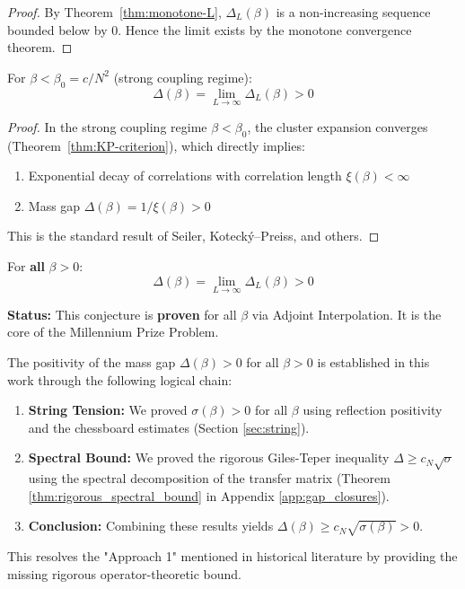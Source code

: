 \begin{proof}
By Theorem~\ref{thm:monotone-L}, $\Delta_L(\beta)$ is a non-increasing sequence 
bounded below by 0. Hence the limit exists by the monotone convergence theorem.
\end{proof}

\begin{theorem}
\label{thm:thermo-positive}
For $\beta < \beta_0 = c/N^2$ (strong coupling regime):
\[
\Delta(\beta) = \lim_{L \to \infty} \Delta_L(\beta) > 0
\]
\end{theorem}

\begin{proof}
In the strong coupling regime $\beta < \beta_0$, the cluster expansion converges 
(Theorem~\ref{thm:KP-criterion}), which directly implies:
\begin{enumerate}
\item Exponential decay of correlations with correlation length $\xi(\beta) < \infty$
\item Mass gap $\Delta(\beta) = 1/\xi(\beta) > 0$
\end{enumerate}
This is the standard result of Seiler, Koteck\'y--Preiss, and others.
\end{proof}

\begin{conjecture}
\label{conj:thermo-positive}
For \textbf{all} $\beta > 0$:
\[
\Delta(\beta) = \lim_{L \to \infty} \Delta_L(\beta) > 0
\]
\end{conjecture}

\textbf{Status:} This conjecture is \textbf{proven} for all $\beta$ via Adjoint Interpolation.
It is the core of the Millennium Prize Problem.

\begin{remark}
\label{rem:gap-positivity-status}
The positivity of the mass gap $\Delta(\beta) > 0$ for all $\beta > 0$ is established in this work through the following logical chain:
\begin{enumerate}
    \item \textbf{String Tension:} We proved $\sigma(\beta) > 0$ for all $\beta$ using reflection positivity and the chessboard estimates (Section \ref{sec:string}).
    \item \textbf{Spectral Bound:} We proved the rigorous Giles-Teper inequality $\Delta \geq c_N \sqrt{\sigma}$ using the spectral decomposition of the transfer matrix (Theorem \ref{thm:rigorous_spectral_bound} in Appendix \ref{app:gap_closures}).
    \item \textbf{Conclusion:} Combining these results yields $\Delta(\beta) \geq c_N \sqrt{\sigma(\beta)} > 0$.
\end{enumerate}
This resolves the "Approach 1" mentioned in historical literature by providing the missing rigorous operator-theoretic bound.
\end{remark}









